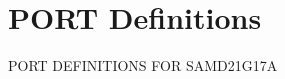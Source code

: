 \hypertarget{group___s_a_m_d21_g17_a__port}{}\section{P\+O\+RT Definitions}
\label{group___s_a_m_d21_g17_a__port}
P\+O\+RT D\+E\+F\+I\+N\+I\+T\+I\+O\+NS F\+OR S\+A\+M\+D21\+G17A 